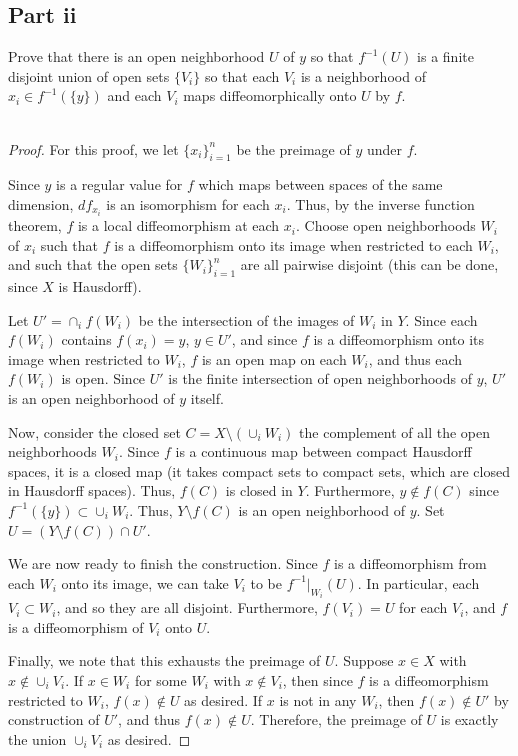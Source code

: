 \documentclass[fontsize=11pt]{scrartcl} %
\numberwithin{equation}{section} %
\numberwithin{figure}{section} %
\numberwithin{table}{section} %
\begin{document}
\subsection*{Part ii}
Prove that there is an open neighborhood $U$ of $y$ so that $f^{-1}(U)$ is a
finite disjoint union of open sets $\{V_i\}$ so that each $V_i$ is a
neighborhood of $x_i\in f^{-1}(\{y\})$ and each $V_i$ maps diffeomorphically
onto $U$ by $f$.
\\
\\
\begin{proof}
    For this proof, we let $\{x_i\}_{i=1}^n$ be the preimage of $y$ under $f$.

    Since $y$ is a regular value for $f$ which maps between spaces of the same
    dimension, $df_{x_i}$ is an isomorphism for each $x_i$. Thus, by the inverse
    function theorem, $f$ is a local diffeomorphism at each $x_i$. Choose
    open neighborhoods $W_i$ of $x_i$ such that $f$ is a diffeomorphism onto its
    image when restricted to each $W_i$, and such that the open sets
    $\{W_i\}_{i=1}^n$ are all pairwise disjoint (this can be done, since $X$ is
    Hausdorff).

    Let $U'=\cap_if(W_i)$ be the intersection of the images of $W_i$ in $Y$.
    Since each $f(W_i)$ contains $f(x_i)=y$, $y\in U'$, and since $f$ is a
    diffeomorphism onto its image when restricted to $W_i$, $f$ is an open map
    on each $W_i$, and thus each $f(W_i)$ is open. Since $U'$ is the finite
    intersection of open neighborhoods of $y$, $U'$ is an open neighborhood of
    $y$ itself.

    Now, consider the closed set $C = X\setminus(\cup_i W_i)$ the complement of
    all the open neighborhoods $W_i$. Since $f$ is a continuous map between
    compact Hausdorff spaces, it is a closed map (it takes compact sets to
    compact sets, which are closed in Hausdorff spaces). Thus, $f(C)$ is closed
    in $Y$. Furthermore, $y\not\in f(C)$ since $f^{-1}(\{y\})\subset \cup_i
    W_i$. Thus, $Y\setminus f(C)$ is an open neighborhood of $y$. Set
    $U=(Y\setminus f(C))\cap U'$.

    We are now ready to finish the construction. Since $f$ is a diffeomorphism
    from each $W_i$ onto its image, we can take $V_i$ to be $f^{-1}|_{W_i}(U)$.
    In particular, each $V_i\subset W_i$, and so they are all disjoint.
    Furthermore, $f(V_i) = U$ for each $V_i$, and $f$ is a diffeomorphism of
    $V_i$ onto $U$.

    Finally, we note that this exhausts the preimage of $U$. Suppose $x\in X$
    with $x\not\in \cup_iV_i$. If $x\in W_i$ for some $W_i$ with $x\not\in V_i$,
    then since $f$ is a diffeomorphism restricted to $W_i$, $f(x)\not\in U$ as
    desired. If $x$ is not in any $W_i$, then $f(x)\not\in U'$ by construction
    of $U'$, and thus $f(x)\not\in U$. Therefore, the preimage of $U$ is exactly
    the union $\cup_iV_i$ as desired.

\end{proof}
\end{document}
